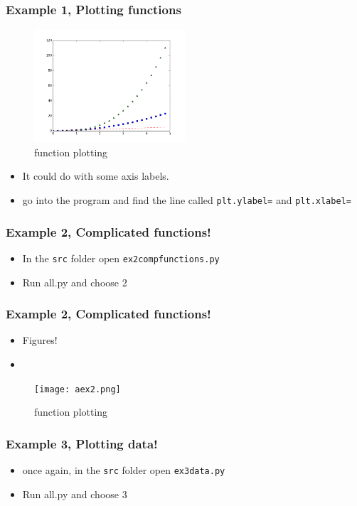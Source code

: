 \documentclass{beamer}
\begin{document}
\begin{frame}
\frametitle{Example 1, Plotting functions}
\begin{figure}
	\centering
	\includegraphics[width=0.5\textwidth]{ex1.png}
	\caption{function plotting}
	\label{fig:function}
\end{figure}
\begin{itemize}
	\item It could do with some axis labels. 
	\item go into the program and find the line called \texttt{plt.ylabel=} and \texttt{plt.xlabel=}  
\end{itemize}
\end{frame}

\begin{frame}
\frametitle{Example 2, Complicated functions!}
\begin{itemize}
\item In the \texttt{src} folder open \texttt{ex2compfunctions.py} 
\item Run all.py and choose 2 
\end{itemize}
\end{frame}

\begin{frame}
\frametitle{Example 2, Complicated functions!}
\begin{itemize}
\item Figures!
\item
\end{itemize}
\begin{figure}
	\centering
	\texttt{[image: aex2.png]}
	\caption{function plotting}
	\label{fig:function}
\end{figure}
\end{frame}


\begin{frame}
\frametitle{Example 3, Plotting data!}
\begin{itemize}
	\item once again, in the \texttt{src} folder open \texttt{ex3data.py}
	\item Run all.py and choose 3 
\end{itemize}
\end{frame}
\end{document}
